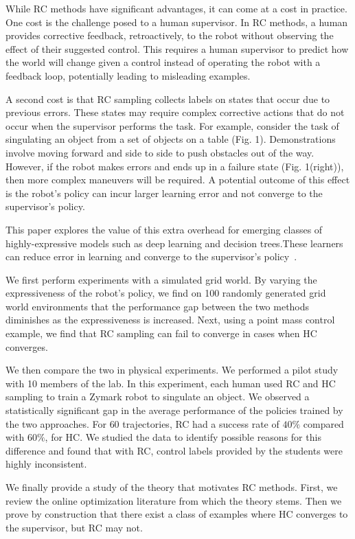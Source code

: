 \documentclass[10pt, conference]{ieeeconf}      %
\begin{document}
While RC methods have significant advantages, it
can come at a cost in practice. One cost is the challenge posed to
a human supervisor. In RC methods, a human provides corrective feedback, retroactively, to the robot without observing the effect of
their suggested control. This requires a human supervisor to
predict how the world will change given a control instead of
operating the robot with a feedback loop, potentially leading
to misleading examples.

A second cost is that RC sampling collects labels on states
that occur due to previous errors. These states may require
 complex corrective actions that do not occur when the
supervisor performs the task. For example, consider the task
of singulating an object from a set of objects on a table (Fig.
1). Demonstrations involve moving forward and
side to side to push obstacles out of the way. However, if
the robot makes errors and ends up in a failure state (Fig.
1(right)), then more complex maneuvers will be required.
A potential outcome of this effect is the robot’s policy can
incur larger learning error and not converge to the
supervisor’s policy.
 
This paper explores the value of this extra overhead for emerging classes of highly-expressive models such as deep learning and decision trees.These learners can reduce error in learning and converge to the supervisor's policy~\cite{vapnik1992principles}.

We first perform experiments with a simulated grid world. By varying the expressiveness of the robot's policy, we find on 100 randomly generated grid world environments that the performance gap between the two methods diminishes as the expressiveness is increased. Next, using a point mass control example, we find that RC sampling can fail to converge in cases when HC converges.

We then compare the two in physical experiments. We performed a pilot study with 10 members of the lab.
In this experiment, each human used RC and HC sampling to train a Zymark robot to singulate an object. We observed a statistically significant gap in the average performance of the policies trained by the two approaches. For $60$  trajectories, RC had a success rate of $40\%$ compared with  $60\%$, for HC. We studied the data to identify possible reasons for this difference and found that with RC, control labels provided by the students were highly inconsistent.

We finally provide a  study of the  theory that motivates RC methods.  First, we review the online optimization literature from which the theory stems. Then we prove by construction that there exist a class of examples where HC converges to the supervisor, but RC may not.
\end{document}
